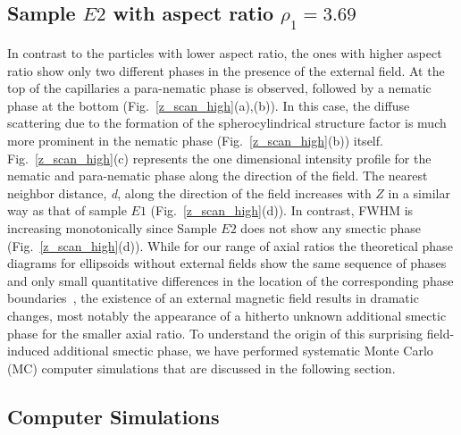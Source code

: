 \documentclass[aps,prl,preprint,superscriptaddress,showkeys]{revtex4-2} %
\begin{document}
\subsection{Sample $E2$ with aspect ratio $\rho_1 = 3.69$}
In contrast to the particles with lower aspect ratio, the ones with higher aspect ratio show only two different phases in the presence of the external field. At the top of the capillaries a para-nematic phase is observed, followed by a nematic phase at the bottom (Fig.~\ref{z_scan_high}(a),(b)). In this case, the diffuse scattering due to the formation of the spherocylindrical structure factor is much more prominent in the nematic phase (Fig.~\ref{z_scan_high}(b)) itself. Fig.~\ref{z_scan_high}(c) represents the one dimensional intensity profile for the nematic and para-nematic phase along the direction of the field. The nearest neighbor distance, \emph{d}, along the direction of the field increases with $Z$ in a similar way as that of sample $E1$ (Fig.~\ref{z_scan_high}(d)). In contrast, FWHM is increasing monotonically since Sample $E2$ does not show any smectic phase (Fig.~\ref{z_scan_high}(d)). While for our range of axial ratios the theoretical phase diagrams for ellipsoids without external fields show the same sequence of phases and only small quantitative differences in the location of the corresponding phase boundaries~\cite{radu2009solid, odriozola2012revisiting, pfleiderer2008crystal}, the existence of an external magnetic field results in dramatic changes, most notably the appearance of a hitherto unknown additional smectic phase for the smaller axial ratio. To understand the origin of this surprising field-induced additional smectic phase, we have performed systematic Monte Carlo (MC) computer simulations that are discussed in the following section.


\subsection{Computer Simulations}
\end{document}
